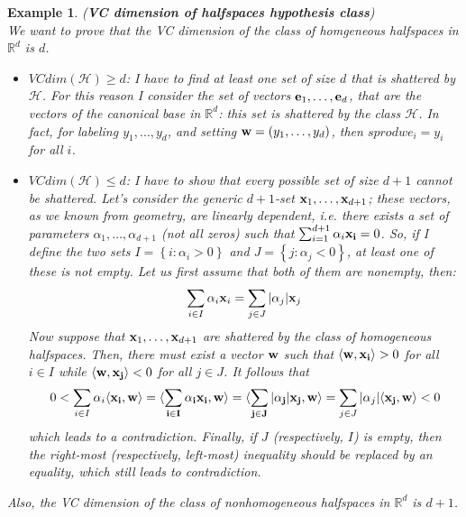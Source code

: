 \documentclass[12pt]{report}
\theoremstyle{plain}
\newtheorem{example}{Example}[chapter]
\newcommand\mcl[1]{\mathcal{#1}}
\newcommand\sprod[2]{\langle \vb{#1},\vb{#2}\rangle}
\begin{document}
\begin{flushleft}
\begin{example} (\textbf{VC dimension of halfspaces hypothesis class})\\
	We want to prove that the VC dimension of the class of homgeneous 
	halfspaces in $\mathds{R}^d$ is $d$.
	\begin{itemize}
		\item $VCdim(\mcl{H})\geq d$: I have to find at least one set of size 
		$d$ that is shattered by $\mcl{H}$. For this reason I consider the set 
		of vectors $\vb{e}_1,\dots,\vb{e}_d$, that are the vectors of the 
		canonical base in $\mathds{R}^d$: this set is shattered by the class 
		$\mcl{H}$. In fact, for labeling $y_1,\dots,y_d$, and setting 
		$\vb{w}=(y_1,\dots,y_d)$, then $sprod{w}{e_i}=y_i$ for all $i$.
		\item $VCdim(\mcl{H})\leq d$: I have to show that every possible set of 
		size $d+1$ cannot be shattered. Let's consider the generic $d+1$-set 
		$\vb{x}_1,\dots,\vb{x}_{d+1}$; these vectors, as we known from 
		geometry, are linearly dependent, i.e. there exists a set of parameters 
		$\alpha_1,\dots,\alpha_{d+1}$ (not all zeros) such that 
		$\sum_{i=1}^{d+1}\alpha_i\vb{x_i}=0$. So, if I define the two sets 
		$I=\left\{i:\alpha_i>0\right\}$ and $J=\left\{j:\alpha_j<0\right\}$, at 
		least one of these is not empty. Let us first assume that both of them 
		are nonempty, then:
		\[ \sum_{i\in I}\alpha_i\vb{x}_i = \sum_{j\in J}\abs{\alpha_j}\vb{x}_j 
		\] 
		Now suppose that $\vb{x}_1,\dots,\vb{x}_{d+1}$ are shattered by the 
		class of homogeneous halfspaces. Then, there must exist a vector 
		$\vb{w}$ such that $\sprod{w}{x_i}>0$ for all $i\in I$ while 
		$\sprod{w}{x_j}<0$ for all $j\in J$. It follows that
		\[ 0<\sum_{i\in I}\alpha_i\sprod{x_i}{w}=\sprod{\sum_{i\in 
		I}\alpha_i\vb{x_i}}{w}=\sprod{\sum_{j\in 
		J}\abs{\alpha_j}\vb{x_j}}{w}=\sum_{j\in 
		J}\abs{\alpha_j}\sprod{x_j}{w}<0 \]
		which leads to a contradiction. Finally, if $J$ (respectively, $I$) is 
		empty, then the right-most (respectively, left-most) inequality should 
		be replaced by an equality, which still leads to contradiction.
	\end{itemize}
	Also, the VC dimension of the class of nonhomogeneous halfspaces in 
	$\mathds{R}^d$ is $d+1$.
\end{example}


\end{flushleft}
\end{document}
